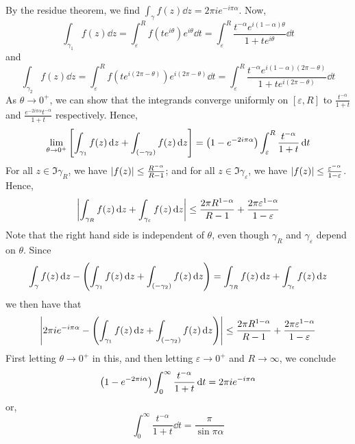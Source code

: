 \begin{example}
	By the residue theorem, we find \( \int_\gamma f(z) \dd{z} = 2\pi i e^{-i\pi \alpha} \).
	Now,
	\[
		\int_{\gamma_1} f(z) \dd{z} = \int_\varepsilon^R f(te^{i\theta}) e^{i\theta} \dd{t} = \int_\varepsilon^R \frac{t^{-\alpha} e^{i(1-\alpha)\theta}}{1+te^{i\theta}} \dd{t}
	\]
	and
	\[
		\int_{\gamma_2} f(z) \dd{z} = \int_\varepsilon^R f(te^{i(2\pi - \theta)}) e^{i(2\pi - \theta)} \dd{t} = \int_\varepsilon^R \frac{t^{-\alpha} e^{i(1-\alpha)(2\pi - \theta)}}{1 + te^{i(2\pi - \theta)}} \dd{t}
	\]
	As \( \theta \to 0^+ \), we can show that the integrands converge uniformly on \( [\varepsilon, R] \) to \( \frac{t^{-\alpha}}{1+t} \) and \( \frac{e^{-2i\pi \alpha}t^{-\alpha}}{1+t} \) respectively.
	Hence,
	\[
		\lim_{\theta \to 0^+} \qty[ \int_{\gamma_1} f(z) \dd{z} + \int_{(-\gamma_2)} f(z) \dd{z} ] = \qty(1 - e^{-2i\pi \alpha}) \int_\varepsilon^R \frac{t^{-\alpha}}{1+t} \dd{t}
	\]
	For all \( z \in \Im \gamma_R \), we have \( \abs{f(z)} \leq \frac{R^{-\alpha}}{R-1} \); and for all \( z \in \Im \gamma_\varepsilon \), we have \( \abs{f(z)} \leq \frac{\varepsilon^{-\alpha}}{1-\varepsilon} \).
	Hence,
	\[
		\abs{\int_{\gamma_R} f(z) \dd{z} + \int_{\gamma_\varepsilon} f(z) \dd{z}} \leq \frac{2\pi R^{1-\alpha}}{R - 1} + \frac{2\pi \varepsilon^{1-\alpha}}{1-\varepsilon}
	\]
	Note that the right hand side is independent of \( \theta \), even though \( \gamma_R \) and \( \gamma_\varepsilon \) depend on \( \theta \).
	Since
	\[
		\int_\gamma f(z) \dd{z} - \qty(\int_{\gamma_1} f(z) \dd{z} + \int_{(-\gamma_2)} f(z) \dd{z}) = \int_{\gamma_R} f(z) \dd{z} + \int_{\gamma_\varepsilon} f(z) \dd{z}
	\]
	we then have that
	\[
		\abs{2\pi i e^{-i\pi \alpha} - \qty(\int_{\gamma_1} f(z) \dd{z} + \int_{(-\gamma_2)} f(z) \dd{z}) } \leq \frac{2\pi R^{1-\alpha}}{R-1} + \frac{2\pi \varepsilon^{1-\alpha}}{1-\varepsilon}
	\]
	First letting \( \theta \to 0^+ \) in this, and then letting \( \varepsilon \to 0^+ \) and \( R \to \infty \), we conclude
	\[
		\qty(1-e^{-2\pi i \alpha}) \int_0^\infty \frac{t^{-\alpha}}{1+t} \dd{t} = 2\pi i e^{-i\pi\alpha}
	\]
	or,
	\[
		\int_0^\infty \frac{t^{-\alpha}}{1+t} \dd{t} = \frac{\pi}{\sin \pi \alpha}
	\]
\end{example}

